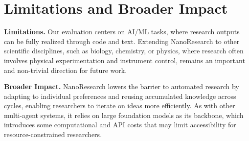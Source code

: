 \documentclass{opendatalab}
\begin{document}
\section{Limitations and Broader Impact}

\noindent\textbf{Limitations.} Our evaluation centers on AI/ML tasks, where research outputs can be fully realized through code and text. Extending NanoResearch to other scientific disciplines, such as biology, chemistry, or physics, where research often involves physical experimentation and instrument control, remains an important and non-trivial direction for future work.

\noindent\textbf{Broader Impact.} NanoResearch lowers the barrier to 
automated research by adapting to individual preferences and reusing 
accumulated knowledge across cycles, enabling researchers to iterate on 
ideas more efficiently. As with other multi-agent systems, it relies on 
large foundation models as its backbone, which introduces some 
computational and API costs that may limit accessibility for 
resource-constrained researchers.
\clearpage
\newpage



\newpage
\beginappendix




\end{document}
